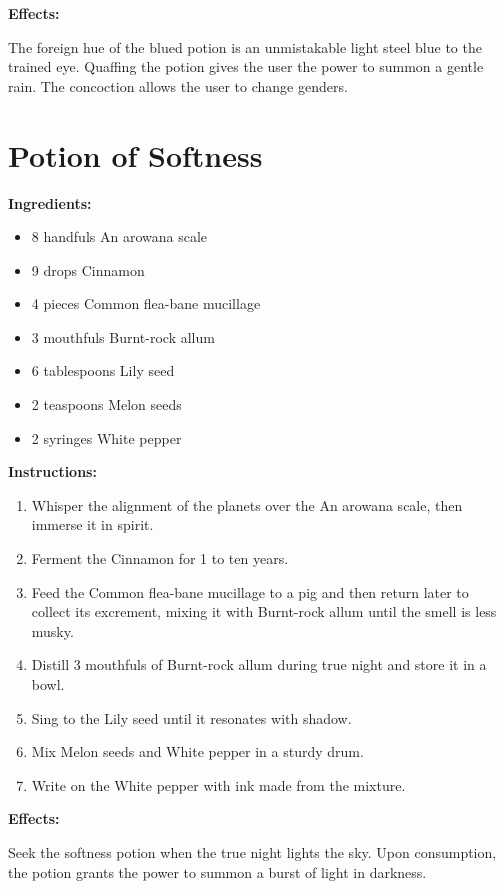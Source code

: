 \documentclass{article}
\begin{document}
\textbf{Effects:}

The foreign hue of the blued potion is an unmistakable light steel blue to the trained eye. Quaffing the potion gives the user the power to summon a gentle rain. The concoction allows the user to change genders.

\newpage
\section*{Potion of Softness}

\textbf{Ingredients:}

\begin{itemize}
  \item 8 handfuls An arowana scale
  \item 9 drops Cinnamon
  \item 4 pieces Common flea-bane mucillage
  \item 3 mouthfuls Burnt-rock allum
  \item 6 tablespoons Lily seed
  \item 2 teaspoons Melon seeds
  \item 2 syringes White pepper
\end{itemize}

\textbf{Instructions:}

\begin{enumerate}
  \item Whisper the alignment of the planets over the An arowana scale, then immerse it in spirit.
  \item Ferment the Cinnamon for 1 to ten years.
  \item Feed the Common flea-bane mucillage to a pig and then return later to collect its excrement, mixing it with Burnt-rock allum until the smell is less musky.
  \item Distill 3 mouthfuls of Burnt-rock allum during true night and store it in a bowl.
  \item Sing to the Lily seed until it resonates with shadow.
  \item Mix Melon seeds and White pepper in a sturdy drum.
  \item Write on the White pepper with ink made from the mixture.
\end{enumerate}

\textbf{Effects:}

Seek the softness potion when the true night lights the sky. Upon consumption, the potion grants the power to summon a burst of light in darkness.
\end{document}
